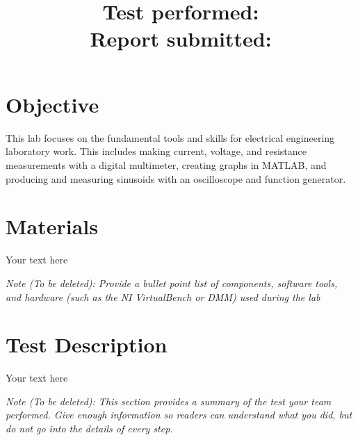 \documentclass[10pt]{article}
\title{
	\textbf{\courseTitle} \\
	\textbf{\documentTitle} \\
	\bigskip
	\textbf{\large{Test performed: \testDate}} \\
	\textbf{\large{Report submitted: \reportDate}} \\
	\bigskip
	\bigskip
}
\author{\documentAuthor}
\date{}
\begin{document}
	
	\maketitle
	
	\newpage
	
	\section{Objective}
	
	This lab focuses on the fundamental tools and skills for electrical engineering laboratory work. This includes making current, voltage, and resistance measurements with a digital multimeter, creating graphs in MATLAB, and producing and measuring sinusoids with an oscilloscope and function generator.  
	
	\medskip
	
	
	
	\section{Materials}
	
	Your text here
	
	\medskip
	
	\textit{Note (To be deleted): Provide a bullet point list of components, software tools, and hardware (such as the NI VirtualBench or DMM) used during the lab}
	
	\section{Test Description}
	
	Your text here
	
	\medskip
	
	\textit{Note (To be deleted): This section provides a summary of the test your team performed. Give enough information so readers can understand what you did, but do not go into the details of every step.}
	
\end{document}
